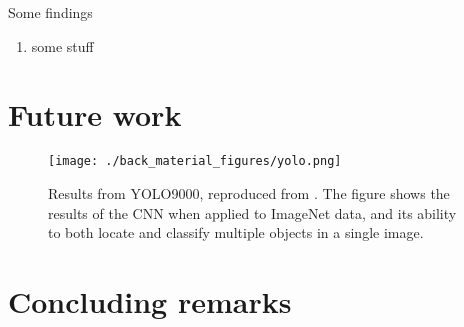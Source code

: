 \begin{refsection}
	Some findings

	\begin{enumerate}
		\item{some stuff }
	\end{enumerate}




\section{Future work}
\label{sec:disc_future_work}


\begin{figure}[]
	\centering
	\texttt{[image: ./back\_material\_figures/yolo.png]}
	\caption[YOLO9000]{Results from YOLO9000, reproduced from \citet{redmon2017}.  The figure shows the results of the CNN when applied to ImageNet data, and its ability to both locate and classify multiple objects in a single image.  }
	\label{fig:disc_yolo}
\end{figure}


\section{Concluding remarks}
\label{sec:disc_conclusions}




\printbibliography[heading=subbibliography]
\end{refsection}
\cleardoublepage
